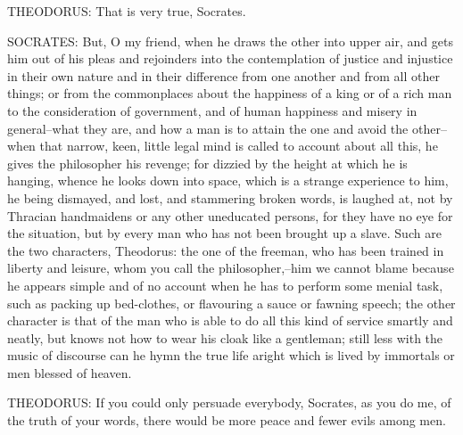 THEODORUS: That is very true, Socrates.

SOCRATES: But, O my friend, when he draws the other into upper air,
and gets him out of his pleas and rejoinders into the contemplation of
justice and injustice in their own nature and in their difference from
one another and from all other things; or from the commonplaces about
the happiness of a king or of a rich man to the consideration of
government, and of human happiness and misery in general--what they
are, and how a man is to attain the one and avoid the other--when that
narrow, keen, little legal mind is called to account about all this, he
gives the philosopher his revenge; for dizzied by the height at which
he is hanging, whence he looks down into space, which is a strange
experience to him, he being dismayed, and lost, and stammering
broken words, is laughed at, not by Thracian handmaidens or any other
uneducated persons, for they have no eye for the situation, but by every
man who has not been brought up a slave. Such are the two characters,
Theodorus: the one of the freeman, who has been trained in liberty and
leisure, whom you call the philosopher,--him we cannot blame because
he appears simple and of no account when he has to perform some menial
task, such as packing up bed-clothes, or flavouring a sauce or fawning
speech; the other character is that of the man who is able to do all
this kind of service smartly and neatly, but knows not how to wear his
cloak like a gentleman; still less with the music of discourse can he
hymn the true life aright which is lived by immortals or men blessed of
heaven.

THEODORUS: If you could only persuade everybody, Socrates, as you do me,
of the truth of your words, there would be more peace and fewer evils
among men.

